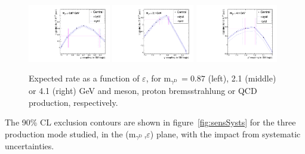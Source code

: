 \documentclass[12pt,a4paper,]{article}
\newcommand{\mathDP}{\gamma^{\mathrm{D}}\ }
\newcommand{\mDP}{m$_{\mathDP}$}
\begin{document}
\begin{figure}[h!]
  \centering
  \includegraphics[width=0.32\textwidth]{figures/RatevsEpsilon_meson_m870.pdf}
  \hfill
  \includegraphics[width=0.32\textwidth]{figures/RatevsEpsilon_pbrem_m2100.pdf}
  \hfill
  \includegraphics[width=0.32\textwidth]{figures/RatevsEpsilon_qcd_m4100.pdf}
\caption{Expected rate as a function of $\varepsilon$, for \mDP$=0.87$ (left),
  2.1 (middle) or 4.1 (right) GeV and meson, proton bremsstrahlung or QCD production,
  respectively.}
\label{fig:ratevseps}
\end{figure}

The 90\% CL exclusion contours are shown in figure~\ref{fig:sensSysts}
for the three production mode studied, in the (\mDP,$\varepsilon$)
plane, with the impact from systematic uncertainties.
\end{document}
